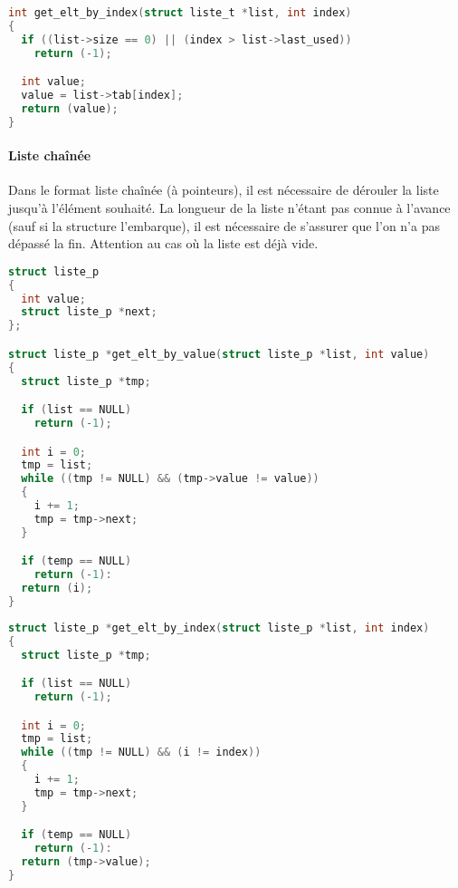 \documentclass[11pt,a4paper]{article}
\begin{document}
\vspace*{-0.5cm}

\begin{lstlisting}[language=C]
int get_elt_by_index(struct liste_t *list, int index)
{
  if ((list->size == 0) || (index > list->last_used))
    return (-1);

  int value;
  value = list->tab[index];
  return (value);
} \end{lstlisting}

\vfillLast

\clearpage

\paragraph{Liste chaînée}

Dans le format liste chaînée (à pointeurs), il est nécessaire de dérouler la liste jusqu'à l'élément souhaité.
La longueur de la liste n'étant pas connue à l'avance (sauf si la structure l'embarque), il est nécessaire de s'assurer que l'on n'a pas dépassé la fin.
Attention au cas où la liste est déjà vide.

\medskip

\begin{lstlisting}[language=C]
struct liste_p
{
  int value;
  struct liste_p *next;
};

struct liste_p *get_elt_by_value(struct liste_p *list, int value)
{
  struct liste_p *tmp;

  if (list == NULL)
    return (-1);

  int i = 0;
  tmp = list;
  while ((tmp != NULL) && (tmp->value != value))
  {
    i += 1;
    tmp = tmp->next;
  }

  if (temp == NULL)
    return (-1):
  return (i);
} \end{lstlisting}

\vspace*{-0.5cm}

\begin{lstlisting}[language=C]
struct liste_p *get_elt_by_index(struct liste_p *list, int index)
{
  struct liste_p *tmp;

  if (list == NULL)
    return (-1);

  int i = 0;
  tmp = list;
  while ((tmp != NULL) && (i != index))
  {
    i += 1;
    tmp = tmp->next;
  }

  if (temp == NULL)
    return (-1):
  return (tmp->value);
} \end{lstlisting}
\end{document}
